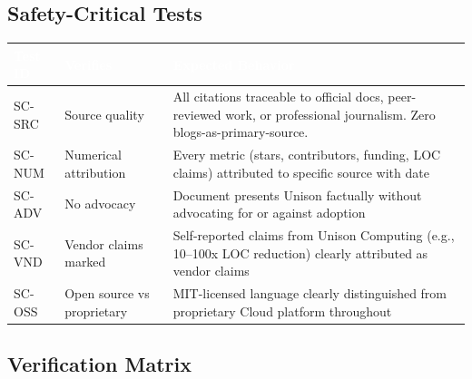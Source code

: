 \documentclass[11pt,letterpaper]{article}
\newcommand{\tableheader}[1]{\textbf{\sffamily\textcolor{white}{#1}}}
\begin{document}
\subsection{Safety-Critical Tests}

\begin{center}
\begin{tabularx}{\textwidth}{C{1.2cm}L{3cm}X}
\toprule
{}
\tableheader{Test ID} & \tableheader{Verifies} & \tableheader{Expected Behavior} \\
\midrule
SC-SRC & Source quality & All citations traceable to official docs, peer-reviewed work, or professional journalism. Zero blogs-as-primary-source. \\
SC-NUM & Numerical attribution & Every metric (stars, contributors, funding, LOC claims) attributed to specific source with date \\
SC-ADV & No advocacy & Document presents Unison factually without advocating for or against adoption \\
SC-VND & Vendor claims marked & Self-reported claims from Unison Computing (e.g., 10--100x LOC reduction) clearly attributed as vendor claims \\
SC-OSS & Open source vs proprietary & MIT-licensed language clearly distinguished from proprietary Cloud platform throughout \\
\bottomrule
\end{tabularx}
\end{center}

\subsection{Verification Matrix}
\end{document}

